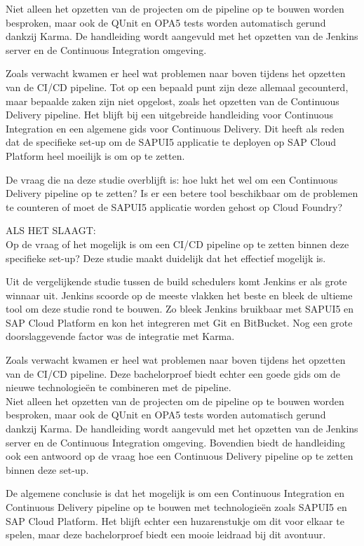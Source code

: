 Niet alleen het opzetten van de projecten om de pipeline op te bouwen worden besproken, maar ook de QUnit en OPA5 tests worden automatisch gerund dankzij Karma. De handleiding wordt aangevuld met het opzetten van de Jenkins server en de Continuous Integration omgeving.

Zoals verwacht kwamen er heel wat problemen naar boven tijdens het opzetten van de CI/CD pipeline. Tot op een bepaald punt zijn deze allemaal gecounterd, maar bepaalde zaken zijn niet opgelost, zoals het opzetten van de Continuous Delivery pipeline.
Het blijft bij een uitgebreide handleiding voor Continuous Integration en een algemene gids voor Continuous Delivery. Dit heeft als reden dat de specifieke set-up om de SAPUI5 applicatie te deployen op SAP Cloud Platform heel moeilijk is om op te zetten.

De vraag die na deze studie overblijft is: hoe lukt het wel om een Continuous Delivery pipeline op te zetten? Is er een betere tool beschikbaar om de problemen te counteren of moet de SAPUI5 applicatie worden gehost op Cloud Foundry?

ALS HET SLAAGT:\\
Op de vraag of het mogelijk is om een CI/CD pipeline op te zetten binnen deze specifieke set-up? Deze studie maakt duidelijk dat het effectief mogelijk is.

Uit de vergelijkende studie tussen de build schedulers komt Jenkins er als grote winnaar uit. Jenkins scoorde op de meeste vlakken het beste en bleek de ultieme tool om deze studie rond te bouwen. Zo bleek Jenkins bruikbaar met SAPUI5 en SAP Cloud Platform en kon het integreren met Git en BitBucket. Nog een grote doorslaggevende factor was de integratie met Karma.

Zoals verwacht kwamen er heel wat problemen naar boven tijdens het opzetten van de CI/CD pipeline. Deze bachelorproef biedt echter een goede gids om de nieuwe technologieën te combineren met de pipeline.\\
Niet alleen het opzetten van de projecten om de pipeline op te bouwen worden besproken, maar ook de QUnit en OPA5 tests worden automatisch gerund dankzij Karma. De handleiding wordt aangevuld met het opzetten van de Jenkins server en de Continuous Integration omgeving. Bovendien biedt de handleiding ook een antwoord op de vraag hoe een Continuous Delivery pipeline op te zetten binnen deze set-up.

De algemene conclusie is dat het mogelijk is om een Continuous Integration en Continuous Delivery pipeline op te bouwen met technologieën zoals SAPUI5 en SAP Cloud Platform. Het blijft echter een huzarenstukje om dit voor elkaar te spelen, maar deze bachelorproef biedt een mooie leidraad bij dit avontuur.